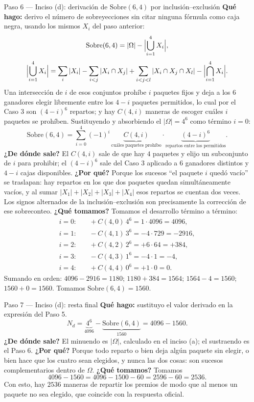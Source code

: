 \documentclass[11pt]{article}
\begin{document}
\begin{sol}
\begin{paso}{Paso 6 --- Inciso (d): derivación de $\text{Sobre}(6,4)$ por inclusión--exclusión}
\textbf{Qué hago:} derivo el número de sobreyecciones sin citar ninguna fórmula como caja negra, usando los mismos $X_i$ del paso anterior:
\[
\text{Sobre}(6,4)=|\Omega|-\Bigl|\bigcup_{i=1}^{4}X_i\Bigr| ,
\]
\[
\Bigl|\bigcup_{i=1}^{4}X_i\Bigr|=\sum_i |X_i|-\sum_{i<j}|X_i\cap X_j|+\sum_{i<j<l}|X_i\cap X_j\cap X_l|-\Bigl|\bigcap_{i=1}^{4}X_i\Bigr| .
\]
Una intersección de $i$ de esos conjuntos prohíbe $i$ paquetes fijos y deja a los $6$ ganadores elegir libremente entre los $4-i$ paquetes permitidos, lo cual por el Caso 3 son $(4-i)^6$ repartos; y hay $C(4,i)$ maneras de escoger cuáles $i$ paquetes se prohíben. Sustituyendo y absorbiendo el $|\Omega|=4^6$ como término $i=0$:
\[
\text{Sobre}(6,4)=\sum_{i=0}^{4}(-1)^i\,\underbrace{C(4,i)}_{\text{cuáles paquetes prohíbo}}\cdot\underbrace{(4-i)^{6}}_{\text{repartos entre los permitidos}} .
\]
\textbf{¿De dónde sale?} El $C(4,i)$ sale de que hay $4$ paquetes y elijo un subconjunto de $i$ para prohibir; el $(4-i)^6$ sale del Caso 3 aplicado a $6$ ganadores distintos y $4-i$ cajas disponibles.
\textbf{¿Por qué?} Porque los sucesos ``el paquete $i$ quedó vacío'' se traslapan: hay repartos en los que dos paquetes quedan simultáneamente vacíos, y al sumar $|X_1|+|X_2|+|X_3|+|X_4|$ esos repartos se cuentan dos veces. Los signos alternados de la inclusión--exclusión son precisamente la corrección de ese sobreconteo.
\textbf{¿Qué tomamos?} Tomamos el desarrollo término a término:
\[
\begin{aligned}
i=0:&\quad +C(4,0)\,4^6=1\cdot 4096=4096,\\
i=1:&\quad -C(4,1)\,3^6=-4\cdot 729=-2916,\\
i=2:&\quad +C(4,2)\,2^6=+6\cdot 64=+384,\\
i=3:&\quad -C(4,3)\,1^6=-4\cdot 1=-4,\\
i=4:&\quad +C(4,4)\,0^6=+1\cdot 0=0 .
\end{aligned}
\]
Sumando en orden: $4096-2916=1180$; $1180+384=1564$; $1564-4=1560$; $1560+0=1560$. Tomamos $\text{Sobre}(6,4)=1560$.
\end{paso}

\begin{paso}{Paso 7 --- Inciso (d): resta final}
\textbf{Qué hago:} sustituyo el valor derivado en la expresión del Paso 5.
\[
N_d=\underbrace{4^6}_{4096}-\underbrace{\text{Sobre}(6,4)}_{1560}=4096-1560 .
\]
\textbf{¿De dónde sale?} El minuendo es $|\Omega|$, calculado en el inciso (a); el sustraendo es el Paso 6.
\textbf{¿Por qué?} Porque todo reparto o bien deja algún paquete sin elegir, o bien hace que los cuatro sean elegidos, y nunca las dos cosas: son sucesos complementarios dentro de $\Omega$.
\textbf{¿Qué tomamos?} Tomamos
\[
4096-1560=4096-1500-60=2596-60=2536 .
\]
Con esto, hay $2536$ maneras de repartir los premios de modo que al menos un paquete no sea elegido, que coincide con la respuesta oficial.
\end{paso}

\end{sol}
\end{document}
